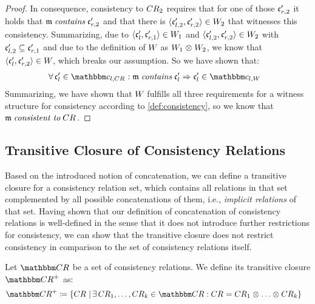 \begin{proof}
    In consequence, consistency to $\consistencyrelation{CR}{2}$ requires that for one of those $\conditionelement{c}{r,2}'$ it holds that $\modeltuple{m} \containsmath \conditionelement{c}{r,2}'$ and that there is $\tupled{\conditionelement{c}{l,2}', \conditionelement{c}{r,2}'} \in \consistencyrelation{W}{2}$ that witnesses this consistency.
    Summarizing, due to $\tupled{\conditionelement{c}{l}', \conditionelement{c}{r,1}'} \in \consistencyrelation{W}{1}$ and $\tupled{\conditionelement{c}{l,2}', \conditionelement{c}{r,2}'} \in \consistencyrelation{W}{2}$ with $\conditionelement{c}{l,2}' \subseteq \conditionelement{c}{r,1}'$ and due to the definition of $\consistencyrelation{W}{}$ as $\consistencyrelation{W}{1} \concat \consistencyrelation{W}{2}$, we know that $\tupled{\conditionelement{c}{l}', \conditionelement{c}{r,2}'} \in \consistencyrelation{W}{}$, which breaks our assumption.
    So we have shown that:
    \begin{align*}
        &
        \forall \conditionelement{c}{l}' \in \condition{c}{l,\consistencyrelation{CR}{}} : \modeltuple{m} \containsmath \conditionelement{c}{l}' \Rightarrow \conditionelement{c}{l}' \in \condition{c}{l,\consistencyrelation{W}{}}
    \end{align*}
    Summarizing, we have shown that $\consistencyrelation{W}{}$ fulfills all three requirements for a witness structure for consistency according to \autoref{def:consistency}, so we know that $\modeltuple{m} \consistenttomath \consistencyrelation{CR}{}$.
\end{proof}


\subsection{Transitive Closure of Consistency Relations}

Based on the introduced notion of concatenation, we can define a transitive closure for a consistency relation set, which contains all relations in that set complemented by all possible concatenations of them, i.e., \emph{implicit relations} of that set.
Having shown that our definition of concatenation of consistency relations is well-defined in the sense that it does not introduce further restrictions for consistency, we can show that the transitive closure does not restrict consistency in comparison to the set of consistency relations itself.

\begin{definition} \label{def:transitiveclosure}
    Let $\consistencyrelationset{CR}$ be a set of consistency relations. We define its transitive closure $\transitiveclosure{\consistencyrelationset{CR}}$ as:
    \begin{align*}
        \transitiveclosure{\consistencyrelationset{CR}{}} \equalsperdefinition \setted{\consistencyrelation{CR}{} \mid & \exists \consistencyrelation{CR}{1}, \dots, \consistencyrelation{CR}{k} \in \consistencyrelationset{CR}{} :
        \consistencyrelation{CR}{} = \consistencyrelation{CR}{1} \concat \dots \concat \consistencyrelation{CR}{k} }
    \end{align*}
\end{definition}

